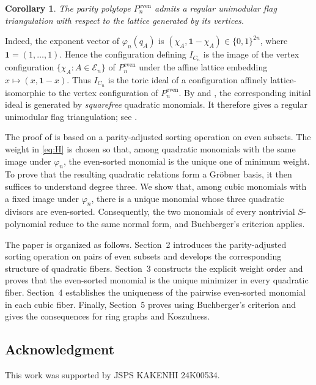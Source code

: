 \documentclass[11pt]{amsart}
\newtheorem{corollary}[theorem]{Corollary}
\theoremstyle{definition}
\newcommand{\En}{\mathcal E_n}
\numberwithin{equation}{section}
\begin{document}
\begin{corollary}\label{cor:triangulation}
The parity polytope $P_n^{\mathrm{even}}$ admits a regular unimodular flag triangulation with respect to the lattice generated by its vertices.
\end{corollary}

Indeed, the exponent vector of $\varphi_n(q_A)$ is
$ (\chi_A,\mathbf 1-\chi_A)\in\{0,1\}^{2n}$,
where $\mathbf 1=(1,\dots,1)$. Hence the configuration defining $I_{C_n}$ is the image of the vertex configuration $\{\chi_A:A\in\En\}$ of $P_n^{\mathrm{even}}$ under the affine lattice embedding
$x\longmapsto (x,\mathbf 1-x)$.
Thus $I_{C_n}$ is the toric ideal of a configuration affinely lattice-isomorphic to the vertex configuration of $P_n^{\mathrm{even}}$. 
By  and
\cite[Proposition~10]{MatsudaOhsugiShibata2019},
the corresponding initial ideal is generated by \textit{squarefree}
quadratic monomials.
It therefore gives a regular unimodular
flag triangulation; see \cite[Chapter~8]{Sturmfels1996}.

The proof of  is based on a parity-adjusted sorting operation on even subsets. The weight in \eqref{eq:H} is chosen so that, among quadratic monomials with the same image under $\varphi_n$, the even-sorted monomial is the unique one of minimum weight. To prove that the resulting quadratic relations form a Gr\"obner basis, it then suffices to understand degree three. We show that, among cubic monomials with a fixed image under $\varphi_n$, there is a unique monomial whose three quadratic divisors are even-sorted. Consequently, the two monomials of every nontrivial $S$-polynomial reduce to the same normal form, and Buchberger's criterion \cite[Theorem~1.29]{HerzogHibiOhsugi2018} applies.


The paper is organized as follows. 
Section~2 introduces the parity-adjusted sorting operation on pairs of even subsets and develops the corresponding structure of quadratic fibers. 
Section~3 constructs the explicit weight order and proves that the
even-sorted monomial is the unique minimizer in every quadratic fiber.
Section~4 establishes the uniqueness of the pairwise even-sorted monomial in each cubic fiber. 
Finally, Section~5 proves  using Buchberger's criterion and gives the consequences for ring graphs and Koszulness.



\subsection*{Acknowledgment}
This work was supported by 
JSPS KAKENHI 24K00534.
\end{document}
